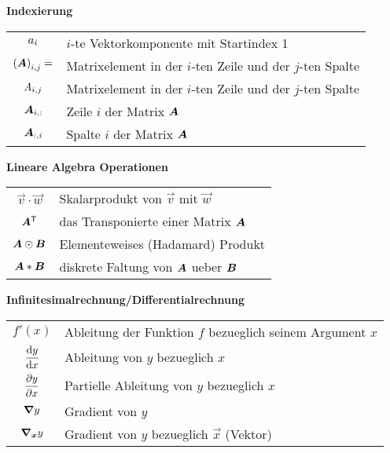\documentclass[../main]{subfiles}
\begin{document}
\begin{center}\textbf{Indexierung}\end{center}
\begin{tabular}{cl}
  $a_i$ & $i$-te Vektorkomponente mit Startindex 1 \\
  ${(\bm{A})}_{i,j} = $ & Matrixelement in der $i$-ten Zeile und der $j$-ten Spalte \\
  $\mathit{A}_{i,j}$ & Matrixelement in der $i$-ten Zeile und der $j$-ten Spalte \\
  $\bm{A}_{i,:}$ & Zeile $i$ der Matrix $\bm{A}$ \\
  $\bm{A}_{:,i}$ & Spalte $i$ der Matrix $\bm{A}$\ \\

\end{tabular}

\begin{center}\textbf{Lineare Algebra Operationen}\end{center}
\begin{tabular}{cl}
  $\vec{v} \cdot \vec{w}$ & Skalarprodukt von $\vec{v}$ mit $\vec{w}$ \\
  $\bm{A}^{\mathsf{T}}$ & das Transponierte einer Matrix $\bm{A}$ \\
  $\bm{A} \odot \bm{B}$ & Elementeweises (Hadamard) Produkt \\
  $\bm{A} * \bm{B}$ & diskrete Faltung von $\bm{A}$ ueber $\bm{B}$

\end{tabular}

\begin{center}\textbf{Infinitesimalrechnung/Differentialrechnung}\end{center}
\begin{tabular}{cl}
  $f'(x)$ & Ableitung der Funktion $f$ bezueglich seinem Argument $x$ \\
  $\displaystyle\frac{\text{d}y}{\text{d}x}$ & Ableitung von $y$ bezueglich $x$ \\[2ex]
  $\displaystyle\frac{\partial y}{\partial x}$ & Partielle Ableitung von $y$ bezueglich $x$ \\[2ex]
  $\bm{\nabla} y$ & Gradient von $y$\\
  $\bm{\nabla}_{\bm{x}}y$ & Gradient von $y$ bezueglich $\vec{x}$ (Vektor) \\

\end{tabular}
\end{document}
